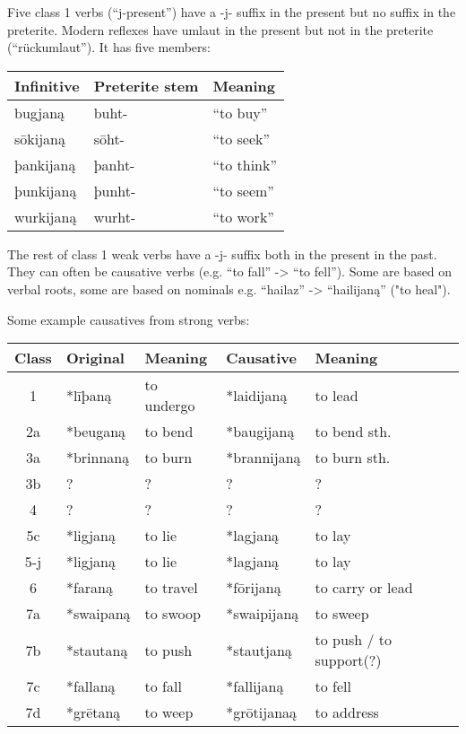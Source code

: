 \documentclass{article}
\begin{document}
\begin{itemize}
\end{itemize}

Five class 1 verbs (``j-present'') have a -j- suffix in the present but no suffix in the preterite. Modern reflexes have umlaut in the present but not in the preterite (``rückumlaut''). It has five members:

\begin{center}
\begin{tabular}{ | l l l |}
\hline
Infinitive & Preterite stem &  Meaning \\
\hline
bugjaną   & buht-  & ``to buy'' \\
sōkijaną  & sōht-  & ``to seek'' \\
þankijaną & þanht- & ``to think'' \\
þunkijaną & þunht- & ``to seem'' \\
wurkijaną & wurht- & ``to work'' \\
\hline
\end{tabular}
\end{center}

The rest of class 1 weak verbs have a -j- suffix both in the present in the past. They can often be causative verbs (e.g. ``to fall'' -> ``to fell''). Some are based on verbal roots, some are based on nominals e.g. ``hailaz'' -> ``hailijaną'' ("to heal").

Some example causatives from strong verbs:

\begin{center}
\begin{tabular}{| c l l l l |}
\hline
Class & Original & Meaning & Causative & Meaning \\
\hline

1   & *līþaną   & to undergo & *laidijaną  & to lead \\
2a  & *beuganą  & to bend    & *baugijaną  & to bend sth. \\
3a  & *brinnaną & to burn    & *brannijaną & to burn sth. \\
3b  & ?        & ?          & ?          & ? \\
4   & ?        & ?          & ?          & ? \\
5c  & *ligjaną  & to lie     & *lagjaną    & to lay \\
5-j & *ligjaną  & to lie     & *lagjaną    & to lay \\
6   & *faraną   & to travel  & *fōrijaną   & to carry or lead \\
7a  & *swaipaną & to swoop   & *swaipijaną & to sweep \\
7b  & *stautaną & to push    & *stautjaną  & to push / to support(?) \\
7c  & *fallaną  & to fall    & *fallijaną  & to fell \\
7d  & *grētaną  & to weep    & *grōtijanaą & to address \\
\hline
\end{tabular}
\end{center}
\end{document}
